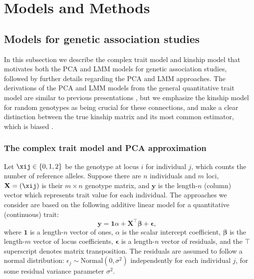 \documentclass[11pt]{article}
\begin{document}

\section{Models and Methods}

\subsection{Models for genetic association studies}

In this subsection we describe the complex trait model and kinship model that motivates both the PCA and LMM models for genetic association studies, followed by further details regarding the PCA and LMM approaches.
The derivations of the PCA and LMM models from the general quantitative trait model are similar to previous presentations \citep{astle_population_2009, hoffman_correcting_2013}, but we emphasize the kinship model for random genotypes as being crucial for these connections, and make a clear distinction between the true kinship matrix and its most common estimator, which is biased \citep{ochoa_estimating_2021, ochoa_human}.

\subsubsection{The complex trait model and PCA approximation}

Let $\xij \in \{ 0, 1, 2 \}$ be the genotype at locus $i$ for individual $j$, which counts the number of reference alleles.
Suppose there are $n$ individuals and $m$ loci,
$\mathbf{X} = ( \xij )$ is their $m \times n$ genotype matrix, and
$\mathbf{y}$ is the length-$n$ (column) vector which represents trait value for each individual.
The approaches we consider are based on the following additive linear model for a quantitative (continuous) trait:
\begin{equation}
  \label{eq:trait}
  \mathbf{y}
  =
  \mathbf{1} \alpha + \mathbf{X}^\intercal \boldsymbol{\beta} + \boldsymbol{\epsilon}
  ,
\end{equation}
where
$\mathbf{1}$ is a length-$n$ vector of ones,
$\alpha$ is the scalar intercept coefficient,
$\boldsymbol{\beta}$ is the length-$m$ vector of locus coefficients,
$\boldsymbol{\epsilon}$ is a length-$n$ vector of residuals,
and the $\intercal$ superscript denotes matrix transposition.
The residuals are assumed to follow a normal distribution: $\epsilon_j \sim \text{Normal}(0, \sigma^2)$ independently for each individual $j$, for some residual variance parameter $\sigma^2$.
\end{document}
